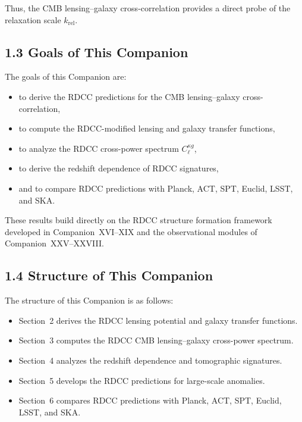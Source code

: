 \documentclass[11pt,a4paper]{article}
\begin{document}
Thus, the CMB lensing–galaxy cross-correlation provides a direct probe of the relaxation 
scale $k_{\mathrm{rel}}$.

\subsection*{1.3 Goals of This Companion}

The goals of this Companion are:

\begin{itemize}
    \item to derive the RDCC predictions for the CMB lensing–galaxy cross-correlation,
    \item to compute the RDCC-modified lensing and galaxy transfer functions,
    \item to analyze the RDCC cross-power spectrum $C_{\ell}^{\kappa g}$,
    \item to derive the redshift dependence of RDCC signatures,
    \item and to compare RDCC predictions with Planck, ACT, SPT, Euclid, LSST, and SKA.
\end{itemize}

These results build directly on the RDCC structure formation framework developed in 
Companion~XVI–XIX and the observational modules of Companion~XXV–XXVIII.

\subsection*{1.4 Structure of This Companion}

The structure of this Companion is as follows:

\begin{itemize}
    \item Section~2 derives the RDCC lensing potential and galaxy transfer functions.
    \item Section~3 computes the RDCC CMB lensing–galaxy cross-power spectrum.
    \item Section~4 analyzes the redshift dependence and tomographic signatures.
    \item Section~5 develops the RDCC predictions for large-scale anomalies.
    \item Section~6 compares RDCC predictions with Planck, ACT, SPT, Euclid, LSST, and SKA.
\end{itemize}
\end{document}
